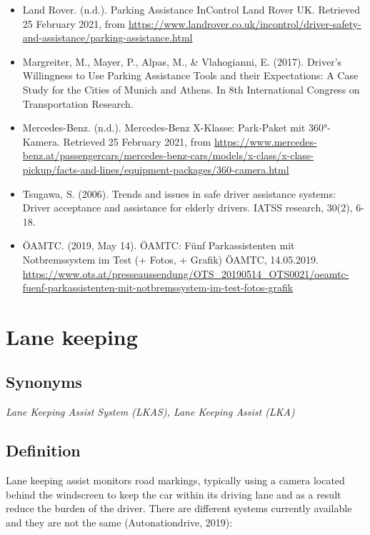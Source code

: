 \documentclass[
]{book}
\begin{document}
\begin{itemize}
\item
  Land Rover. (n.d.). Parking Assistance \textbar{} InControl \textbar{} Land Rover UK. Retrieved 25 February 2021, from \url{https://www.landrover.co.uk/incontrol/driver-safety-and-assistance/parking-assistance.html}
\item
  Margreiter, M., Mayer, P., Alpas, M., \& Vlahogianni, E. (2017). Driver's Willingness to Use Parking Assistance Tools and their Expectations: A Case Study for the Cities of Munich and Athens. In 8th International Congress on Transportation Research.
\item
  Mercedes-Benz. (n.d.). Mercedes-Benz X-Klasse: Park-Paket mit 360°-Kamera. Retrieved 25 February 2021, from \url{https://www.mercedes-benz.at/passengercars/mercedes-benz-cars/models/x-class/x-class-pickup/facts-and-lines/equipment-packages/360-camera.html}
\item
  Tsugawa, S. (2006). Trends and issues in safe driver assistance systems: Driver acceptance and assistance for elderly drivers. IATSS research, 30(2), 6-18.
\item
  ÖAMTC. (2019, May 14). ÖAMTC: Fünf Parkassistenten mit Notbremssystem im Test (+ Fotos, + Grafik) \textbar{} ÖAMTC, 14.05.2019. \url{https://www.ots.at/presseaussendung/OTS_20190514_OTS0021/oeamtc-fuenf-parkassistenten-mit-notbremssystem-im-test-fotos-grafik}
\end{itemize}

\hypertarget{lane_keeping}{%
\section{Lane keeping}\label{lane_keeping}}

\hypertarget{synonyms-22}{%
\subsection*{Synonyms}\label{synonyms-22}}

\emph{Lane Keeping Assist System (LKAS), Lane Keeping Assist (LKA)}

\hypertarget{definition-25}{%
\subsection*{Definition}\label{definition-25}}

Lane keeping assist monitors road markings, typically using a camera located behind the windscreen to keep the car within its driving lane and as a result reduce the burden of the driver. There are different systems currently available and they are not the same (Autonationdrive, 2019):
\end{document}
